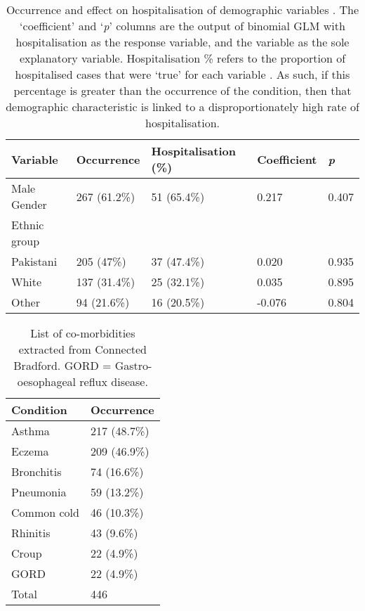 
\begin{table}[H]
   \caption[Occurrence and effect on hospitalisation of demographic variables]{Occurrence and effect on hospitalisation of demographic variables . The `coefficient' and `\textit{p}' columns are the output of binomial GLM with hospitalisation as the response variable, and the variable as the sole explanatory variable. Hospitalisation \% refers to the proportion of hospitalised cases that were `true' for each variable . As such, if this percentage is greater than the occurrence of the condition, then that demographic characteristic is linked to a disproportionately high rate of hospitalisation.}
\centering
\begin{tabular}{P{2.25cm}P{2.25cm}P{2.25cm}P{1.75cm}P{1cm}}
  \hline
Variable & Occurrence & Hospitalisation (\%) & Coefficient & \textit{p} \\ 
  \hline
Male Gender & 267 (61.2\%) & 51 (65.4\%) & 0.217 & 0.407 \\ 
Ethnic group & &\\
  \quad Pakistani & 205 (47\%) & 37 (47.4\%) & 0.020 & 0.935\\ 
  \quad White & 137 (31.4\%) & 25 (32.1\%) & 0.035 & 0.895  \\ 
  \quad Other & 94 (21.6\%) & 16 (20.5\%) & -0.076 & 0.804\\ 
   \hline
\end{tabular}\label{tab:additional-demographics-table}
\end{table}

   \begin{table}[H]
   \caption[List of co-morbidities extracted from Connected Bradford]{List of co-morbidities extracted from Connected Bradford. GORD = Gastro-oesophageal reflux disease.}
       \centering
       \begin{tabular}{P{2.5cm}P{2.5cm}}
           \hline
           Condition & Occurrence\\
           \hline
Asthma & 217 (48.7\%) \\ 
  Eczema & 209 (46.9\%) \\ 
  Bronchitis & 74 (16.6\%) \\ 
  Pneumonia & 59 (13.2\%) \\ 
  Common cold & 46 (10.3\%) \\ 
  Rhinitis & 43 (9.6\%) \\ 
  Croup & 22 (4.9\%) \\ 
  GORD & 22 (4.9\%) \\ 
           \hline
           	Total & 446\\
           	\hline
       \end{tabular}\label{tab:additional-comorbidity-table}
   \end{table}
   
